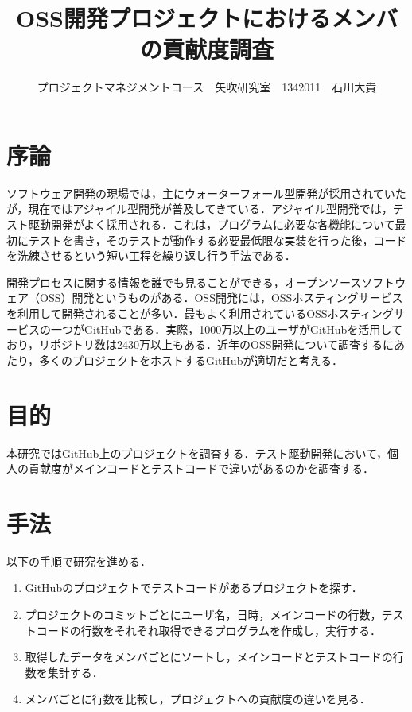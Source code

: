 \documentclass[uplatex,twocolumn,dvipdfmx]{jsarticle}
\title{\vspace{-5mm}\fontsize{14pt}{0pt}\selectfont OSS開発プロジェクトにおけるメンバの貢献度調査}
\author{\normalsize プロジェクトマネジメントコース　矢吹研究室　1342011　石川大貴}
\date{}
\begin{document}
\fontsize{10.5pt}{\baselineskip}\selectfont
\maketitle





\section{序論}

ソフトウェア開発の現場では，主にウォーターフォール型開発が採用されていたが，現在ではアジャイル型開発が普及してきている．アジャイル型開発では，テスト駆動開発がよく採用される．これは，プログラムに必要な各機能について最初にテストを書き，そのテストが動作する必要最低限な実装を行った後，コードを洗練させるという短い工程を繰り返し行う手法である\cite{shimizu2012}．

開発プロセスに関する情報を誰でも見ることができる，オープンソースソフトウェア（OSS）開発というものがある．OSS開発には，OSSホスティングサービスを利用して開発されることが多い．最もよく利用されているOSSホスティングサービスの一つがGitHubである．実際，1000万以上のユーザがGitHubを活用しており，リポジトリ数は2430万以上もある\cite{github}．近年のOSS開発について調査するにあたり，多くのプロジェクトをホストするGitHubが適切だと考える．


\section{目的}

本研究ではGitHub上のプロジェクトを調査する．テスト駆動開発において，個人の貢献度がメインコードとテストコードで違いがあるのかを調査する．


\section{手法}
以下の手順で研究を進める．
\begin{enumerate}
\item GitHubのプロジェクトでテストコードがあるプロジェクトを探す．
\item プロジェクトのコミットごとにユーザ名，日時，メインコードの行数，テストコードの行数をそれぞれ取得できるプログラムを作成し，実行する．
\item 取得したデータをメンバごとにソートし，メインコードとテストコードの行数を集計する．
\item メンバごとに行数を比較し，プロジェクトへの貢献度の違いを見る．
\end{enumerate}
\end{document}
